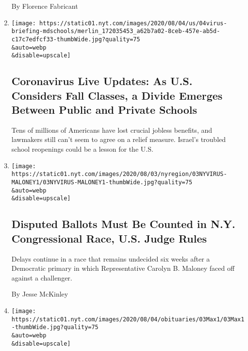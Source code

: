 \begin{enumerate}
  By Florence Fabricant
\item
  \href{/2020/08/04/world/coronavirus-cases.html}{}

  \texttt{[image: https://static01.nyt.com/images/2020/08/04/us/04virus-briefing-mdschools/merlin\_172035453\_a62b7a02-8ceb-457e-ab5d-c17c7edfcf33-thumbWide.jpg?quality=75\\\&auto=webp\\\&disable=upscale]}

  \hypertarget{coronavirus-live-updates-as-us-considers-fall-classes-a-divide-emerges-between-public-and-private-schools}{%
  \subsection{Coronavirus Live Updates: As U.S. Considers Fall Classes,
  a Divide Emerges Between Public and Private
  Schools}\label{coronavirus-live-updates-as-us-considers-fall-classes-a-divide-emerges-between-public-and-private-schools}}

  Tens of millions of Americans have lost crucial jobless benefits, and
  lawmakers still can't seem to agree on a relief measure. Israel's
  troubled school reopenings could be a lesson for the U.S.
\item
  \href{/2020/08/03/nyregion/nyc-congress-carolyn-maloney-ballots.html}{}

  \texttt{[image: https://static01.nyt.com/images/2020/08/03/nyregion/03NYVIRUS-MALONEY1/03NYVIRUS-MALONEY1-thumbWide.jpg?quality=75\\\&auto=webp\\\&disable=upscale]}

  \hypertarget{disputed-ballots-must-be-counted-in-ny-congressional-race-us-judge-rules}{%
  \subsection{Disputed Ballots Must Be Counted in N.Y. Congressional
  Race, U.S. Judge
  Rules}\label{disputed-ballots-must-be-counted-in-ny-congressional-race-us-judge-rules}}

  Delays continue in a race that remains undecided six weeks after a
  Democratic primary in which Representative Carolyn B. Maloney faced
  off against a challenger.

  By Jesse McKinley
\item
  \href{/2020/08/03/arts/adam-max-patron-of-brooklyn-cultural-institutions-dies-at-62.html}{}

  \texttt{[image: https://static01.nyt.com/images/2020/08/04/obituaries/03Max1/03Max1-thumbWide.jpg?quality=75\\\&auto=webp\\\&disable=upscale]}

  \hypertarget{adam-max-patron-of-brooklyn-cultural-institutions-dies-at-62}{%
}
\end{enumerate}
